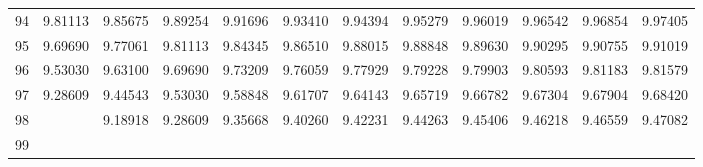 \begin{center}
\begin{tabular}{|r|rrrrrrrrrrr|}
94&9.81113&9.85675&9.89254&9.91696&9.93410&9.94394&9.95279&9.96019&9.96542&9.96854&9.97405\\[5pt]
95&9.69690&9.77061&9.81113&9.84345&9.86510&9.88015&9.88848&9.89630&9.90295&9.90755&9.91019\\
96&9.53030&9.63100&9.69690&9.73209&9.76059&9.77929&9.79228&9.79903&9.80593&9.81183&9.81579\\
97&9.28609&9.44543&9.53030&9.58848&9.61707&9.64143&9.65719&9.66782&9.67304&9.67904&9.68420\\
98&&9.18918&9.28609&9.35668&9.40260&9.42231&9.44263&9.45406&9.46218&9.46559&9.47082\\
99&&&&&&&&&&&\\
\hline\end{tabular}
\end{center}
